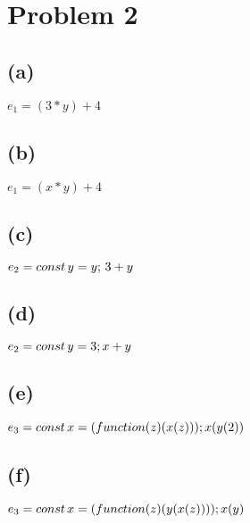 \documentclass[11pt, oneside]{article}
\begin{document}
\section{Problem 2}
\subsection*{(a)} $e_1 = (3 * y) + 4$

\subsection*{(b)} $e_1 = (x * y) + 4$

\subsection*{(c)} $e_2 = const \thinspace y = y; \thinspace 3 + y$

\subsection*{(d)} $e_2 = const \thinspace y = 3; x + y$

\subsection*{(e)} $e_3 = const \thinspace x = (function (z) (x(z))); x(y(2))$

\subsection*{(f)} $e_3 = const \thinspace x = (function (z) (y(x(z)))); x(y)$
\end{document}

